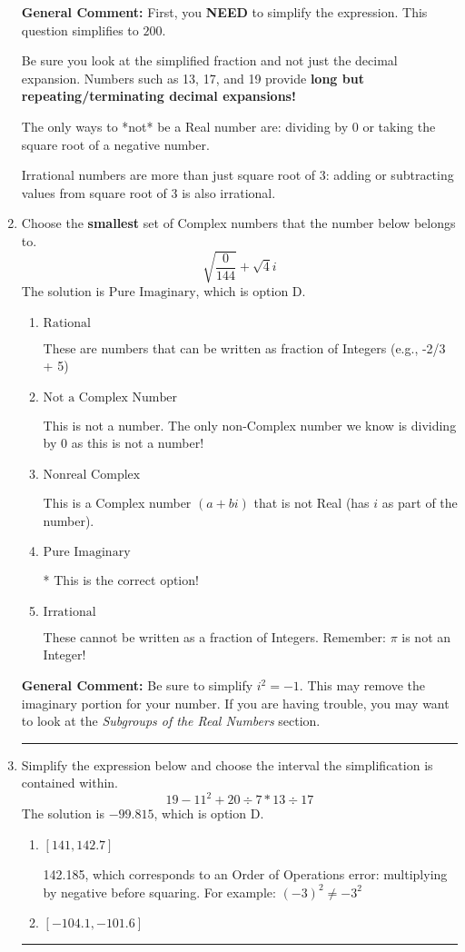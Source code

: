 \documentclass{extbook}[14pt]
\newcommand{\litem}[1]{\item #1

\rule{\textwidth}{0.4pt}}
\begin{document}
\begin{enumerate}
{\textbf{General Comment:} First, you \textbf{NEED} to simplify the expression. This question simplifies to $200$. 
 
 Be sure you look at the simplified fraction and not just the decimal expansion. Numbers such as 13, 17, and 19 provide \textbf{long but repeating/terminating decimal expansions!} 
 
 The only ways to *not* be a Real number are: dividing by 0 or taking the square root of a negative number. 
 
 Irrational numbers are more than just square root of 3: adding or subtracting values from square root of 3 is also irrational.
}
\litem{
Choose the \textbf{smallest} set of Complex numbers that the number below belongs to.
\[ \sqrt{\frac{0}{144}}+\sqrt{4}i \]The solution is \( \text{Pure Imaginary} \), which is option D.\begin{enumerate}[label=\Alph*.]
\item \( \text{Rational} \)

These are numbers that can be written as fraction of Integers (e.g., -2/3 + 5)
\item \( \text{Not a Complex Number} \)

This is not a number. The only non-Complex number we know is dividing by 0 as this is not a number!
\item \( \text{Nonreal Complex} \)

This is a Complex number $(a+bi)$ that is not Real (has $i$ as part of the number).
\item \( \text{Pure Imaginary} \)

* This is the correct option!
\item \( \text{Irrational} \)

These cannot be written as a fraction of Integers. Remember: $\pi$ is not an Integer!
\end{enumerate}

\textbf{General Comment:} Be sure to simplify $i^2 = -1$. This may remove the imaginary portion for your number. If you are having trouble, you may want to look at the \textit{Subgroups of the Real Numbers} section.
}
\litem{
Simplify the expression below and choose the interval the simplification is contained within.
\[ 19 - 11^2 + 20 \div 7 * 13 \div 17 \]The solution is \( -99.815 \), which is option D.\begin{enumerate}[label=\Alph*.]
\item \( [141, 142.7] \)

 142.185, which corresponds to an Order of Operations error: multiplying by negative before squaring. For example: $(-3)^2 \neq -3^2$
\item \( [-104.1, -101.6] \)


\end{enumerate}}
\end{enumerate}
\end{document}

